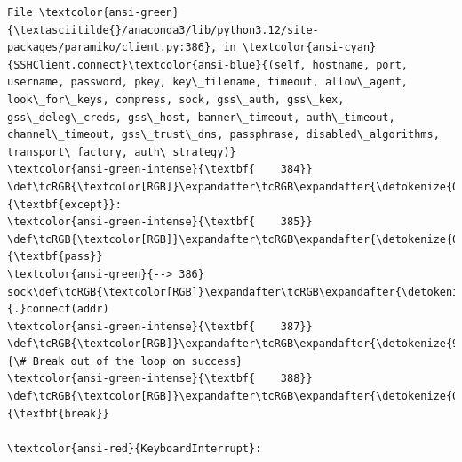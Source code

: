 \documentclass[11pt]{article}
\begin{document}
\begin{Verbatim}[commandchars=\\\{\}, frame=single, framerule=2mm, rulecolor=\color{outerrorbackground}]
File \textcolor{ansi-green}{\textasciitilde{}/anaconda3/lib/python3.12/site-packages/paramiko/client.py:386}, in \textcolor{ansi-cyan}{SSHClient.connect}\textcolor{ansi-blue}{(self, hostname, port, username, password, pkey, key\_filename, timeout, allow\_agent, look\_for\_keys, compress, sock, gss\_auth, gss\_kex, gss\_deleg\_creds, gss\_host, banner\_timeout, auth\_timeout, channel\_timeout, gss\_trust\_dns, passphrase, disabled\_algorithms, transport\_factory, auth\_strategy)}
\textcolor{ansi-green-intense}{\textbf{    384}}     \def\tcRGB{\textcolor[RGB]}\expandafter\tcRGB\expandafter{\detokenize{0,135,0}}{\textbf{except}}:
\textcolor{ansi-green-intense}{\textbf{    385}}         \def\tcRGB{\textcolor[RGB]}\expandafter\tcRGB\expandafter{\detokenize{0,135,0}}{\textbf{pass}}
\textcolor{ansi-green}{--> 386} sock\def\tcRGB{\textcolor[RGB]}\expandafter\tcRGB\expandafter{\detokenize{98,98,98}}{.}connect(addr)
\textcolor{ansi-green-intense}{\textbf{    387}} \def\tcRGB{\textcolor[RGB]}\expandafter\tcRGB\expandafter{\detokenize{95,135,135}}{\# Break out of the loop on success}
\textcolor{ansi-green-intense}{\textbf{    388}} \def\tcRGB{\textcolor[RGB]}\expandafter\tcRGB\expandafter{\detokenize{0,135,0}}{\textbf{break}}

\textcolor{ansi-red}{KeyboardInterrupt}: 
    \end{Verbatim}
\end{document}
